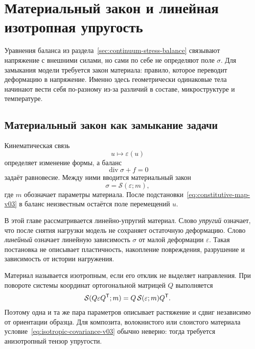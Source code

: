 \section{Материальный закон и линейная изотропная упругость}
\label{sec:linear-isotropic-elasticity}

Уравнения баланса из раздела~\ref{sec:continuum-stress-balance} связывают напряжение с внешними силами, но сами по себе не определяют поле $\sigma$. Для замыкания модели требуется закон материала: правило, которое переводит деформацию в напряжение. Именно здесь геометрически одинаковые тела начинают вести себя по-разному из-за различий в составе, микроструктуре и температуре.

\subsection{Материальный закон как замыкание задачи}

Кинематическая связь
\[
 u\longmapsto\varepsilon(u)
\]
определяет изменение формы, а баланс
\[
 \operatorname{div}\sigma+f=0
\]
задаёт равновесие. Между ними вводится материальный закон
\begin{equation}
\label{eq:constitutive-map-v03}
 \sigma=\mathcal{S}(\varepsilon;m),
\end{equation}
где $m$ обозначает параметры материала. После подстановки~\eqref{eq:constitutive-map-v03} в баланс неизвестным остаётся поле перемещений $u$.

В этой главе рассматривается линейно-упругий материал. Слово \emph{упругий} означает, что после снятия нагрузки модель не сохраняет остаточную деформацию. Слово \emph{линейный} означает линейную зависимость $\sigma$ от малой деформации $\varepsilon$. Такая постановка не описывает пластичность, накопление повреждения, разрушение и зависимость от истории нагружения.

Материал называется изотропным, если его отклик не выделяет направления. При повороте системы координат ортогональной матрицей $Q$ выполняется
\begin{equation}
\label{eq:isotropic-covariance-v03}
 \mathcal{S}(Q\varepsilon Q^{\mathsf{T}};m)
 =Q\,\mathcal{S}(\varepsilon;m)Q^{\mathsf{T}}.
\end{equation}
Поэтому одна и та же пара параметров описывает растяжение и сдвиг независимо от ориентации образца. Для композита, волокнистого или слоистого материала условие~\eqref{eq:isotropic-covariance-v03} обычно неверно: тогда требуется анизотропный тензор упругости.


